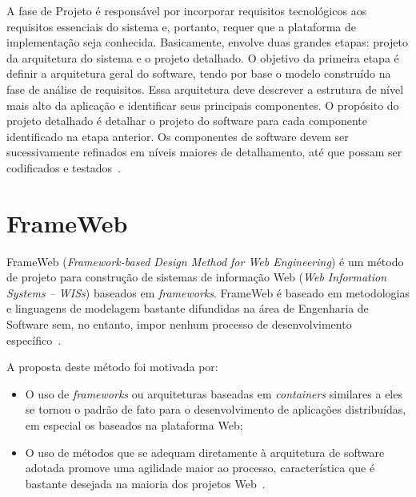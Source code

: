A fase de Projeto é responsável por incorporar requisitos tecnológicos aos requisitos essenciais do sistema e, portanto, requer que a plataforma de implementação seja conhecida. Basicamente, envolve duas grandes etapas: projeto da arquitetura do sistema e o projeto detalhado. O objetivo da primeira etapa é definir a arquitetura geral do software, tendo por base o modelo construído na fase de análise de requisitos. Essa arquitetura deve descrever a estrutura de nível mais alto da aplicação e identificar seus principais componentes. O propósito do projeto detalhado é detalhar o projeto do software para cada componente identificado na etapa anterior. Os componentes de software devem ser sucessivamente refinados em níveis maiores de detalhamento, até que possam ser codificados e testados~\cite{falboEngSoft}. 






\section{FrameWeb}
\label{sec-referencial-frameweb}

FrameWeb (\textit{Framework-based Design Method for Web Engineering}) é um método de projeto para construção de sistemas de informação Web (\textit{Web Information Systems – WISs}) baseados em \textit{frameworks}. FrameWeb é baseado em metodologias e linguagens de modelagem bastante difundidas na área de Engenharia de Software sem, no entanto, impor nenhum processo de desenvolvimento específico~\cite{vitorFrameWeb}.

A proposta deste método foi motivada por:

\begin{itemize}
	\item O uso de \textit{frameworks} ou arquiteturas baseadas em \textit{containers} similares a eles se tornou o padrão de fato para o desenvolvimento de aplicações distribuídas, em especial os baseados na plataforma Web;
	
	\item O uso de métodos que se adequam diretamente à arquitetura de software adotada promove uma agilidade maior ao processo, característica que é bastante desejada na maioria dos projetos Web~\cite{presmannSoft}.
\end{itemize}

